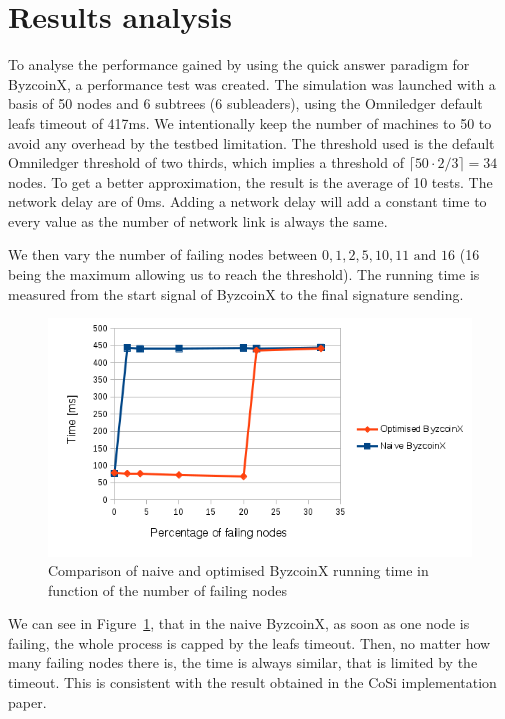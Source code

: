 \documentclass[11pt, a4paper, twoside, openright]{article}
\begin{document}
\section{Results analysis}

To analyse the performance gained by using the quick answer paradigm for ByzcoinX, a performance test was created. The simulation was launched with a basis of 50 nodes and 6 subtrees (6 subleaders), using the Omniledger default leafs timeout of 417ms. We intentionally keep the number of machines to 50 to avoid any overhead by the testbed limitation. The threshold used is the default Omniledger threshold of two thirds, which implies a threshold of $ {\lceil 50 \cdot 2/3\rceil} = 34$ nodes. To get a better approximation, the result is the average of 10 tests. The network delay are of 0ms. Adding a network delay will add a constant time to every value as the number of network link is always the same. 

We then vary the number of failing nodes between $0, 1, 2, 5, 10, 11 \text{ and } 16$ (16 being the maximum allowing us to reach the threshold). The running time is measured from the start signal of ByzcoinX to the final signature sending.
\begin{figure}
 \centering
  \includegraphics[width=\textwidth]{time_ByzcoinX.png}
  \caption{Comparison of naive and optimised ByzcoinX running time in function of the number of failing nodes}
  \label{fig:performance}
\end{figure}

We can see in Figure~\ref{fig:performance}, that in the naive ByzcoinX, as soon as one node is failing, the whole process is capped by the leafs timeout. Then, no matter how many failing nodes there is, the time is always similar, that is limited by the timeout. This is consistent with the result obtained in the CoSi implementation paper\cite{CoSi_implementation}.
\end{document}
